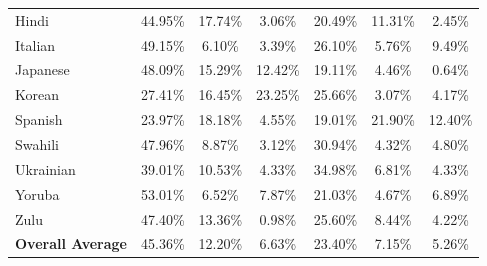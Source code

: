 \begin{table}[t]
\begin{tabular}{lcccccc}
    Hindi     & 44.95\% & \textcolor{highlightorange}{17.74\%} & 3.06\%   & 20.49\% & \textcolor{highlightorange}{11.31\%} & 2.45\%   \\
    Italian   & \textcolor{highlightorange}{49.15\%} & 6.10\%     & 3.39\%   & \textcolor{highlightorange}{26.10\%}   & 5.76\%   & \textcolor{highlightorange}{9.49\%}   \\
    Japanese  & \textcolor{highlightorange}{48.09\%} & \textcolor{highlightorange}{15.29\%} & \textcolor{highlightorange}{12.42\%} & 19.11\% & 4.46\%   & 0.64\%   \\
    Korean    & 27.41\% & \textcolor{highlightorange}{16.45\%} & \textcolor{highlightorange}{23.25\%} & \textcolor{highlightorange}{25.66\%} & 3.07\%   & 4.17\%   \\
    Spanish   & 23.97\% & \textcolor{highlightorange}{18.18\%} & 4.55\%   & 19.01\% & \textcolor{highlightorange}{21.90\%}     & \textcolor{highlightorange}{12.40\%}    \\
    Swahili   & \textcolor{highlightorange}{47.96\%} & 8.87\%   & 3.12\%   & \textcolor{highlightorange}{30.94\%} & 4.32\%   & 4.80\%    \\
    Ukrainian & 39.01\% & 10.53\% & 4.33\%   & \textcolor{highlightorange}{34.98\%} & 6.81\%   & 4.33\%   \\
    Yoruba    & \textcolor{highlightorange}{53.01\%} & 6.52\%   & \textcolor{highlightorange}{7.87\%}   & 21.03\% & 4.67\%   & \textcolor{highlightorange}{6.89\%}   \\
    Zulu      & \textcolor{highlightorange}{47.40\%}   & \textcolor{highlightorange}{13.36\%} & 0.98\%   & \textcolor{highlightorange}{25.60\%}   & \textcolor{highlightorange}{8.44\%}   & 4.22\%   \\
    \textbf{Overall Average} & 45.36\% & 12.20\% & 6.63\% & 23.40\% & 7.15\% & 5.26\% \\
    \bottomrule[1.5pt]
\end{tabular}
\end{table}

